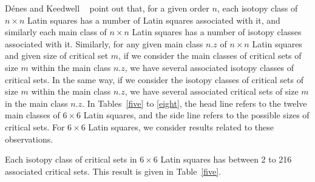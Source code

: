 \documentclass[12pt]{report}
\begin{document}

D{\'e}nes and Keedwell ~\cite{dk} point out that, for a given order $n$, each
isotopy class of $n \times n$ Latin squares has a number of Latin
squares associated with it, and similarly each main class of $n \times
n$ Latin squares has a number of isotopy classes associated with it.
Similarly, for any given main class $n.z$ of $n \times n$ Latin squares
and given size of critical set $m$, if we consider the main classes of
critical sets of size $m$ within the main class $n.z$, we have several
associated isotopy classes of critical sets.  In the same way, if we
consider the isotopy classes of critical sets of size $m$ within the
main class $n.z$, we have several associated critical sets of size $m$
in the main class $n.z$.
\newpage
In Tables~\ref{five} to \ref{eight}, the head line refers to the twelve main classes of $6 \times
6$ Latin squares, and the side line refers to the possible sizes of
critical sets.  For $6 \times 6$ Latin squares, we consider results related to these observations.

Each isotopy class of critical sets in $6 \times 6$ Latin squares has between 
2 to 216 associated critical sets.  This result is given in Table~\ref{five}.
\end{document}
